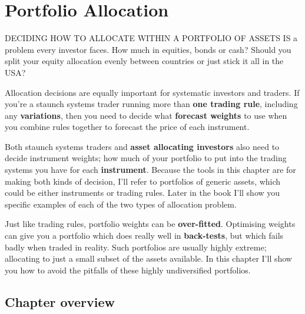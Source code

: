 \chapter{Portfolio Allocation}


DECIDING HOW TO ALLOCATE WITHIN A PORTFOLIO OF ASSETS IS a problem every investor faces. How much in equities, bonds or cash? Should you split your equity allocation evenly between countries or just stick it all in the USA?

Allocation decisions are equally important for systematic investors and traders. If you're a staunch systems trader running more than \textbf{one trading rule}, including any \textbf{variations}, then you need to decide what \textbf{forecast weights} to use when you combine rules together to forecast the price of each instrument. 

Both staunch systems traders and \textbf{asset allocating investors} also need to decide instrument weights; how much of your portfolio to put into the trading systems you have for each \textbf{instrument}. Because the tools in this chapter are for making both kinds of decision, I'll refer to portfolios of generic assets, which could be either instruments or trading rules. Later in the book I'll show you specific examples of each of the two types of allocation problem. 

Just like trading rules, portfolio weights can be \textbf{over-fitted}. Optimising weights can give you a portfolio which does really well in \textbf{back-tests}, but which fails badly when traded in reality. Such portfolios are usually highly extreme; allocating to just a small subset of the assets available. In this chapter I'll show you how to avoid the pitfalls of these highly undiversified portfolios.

\section*{Chapter overview}  {}


